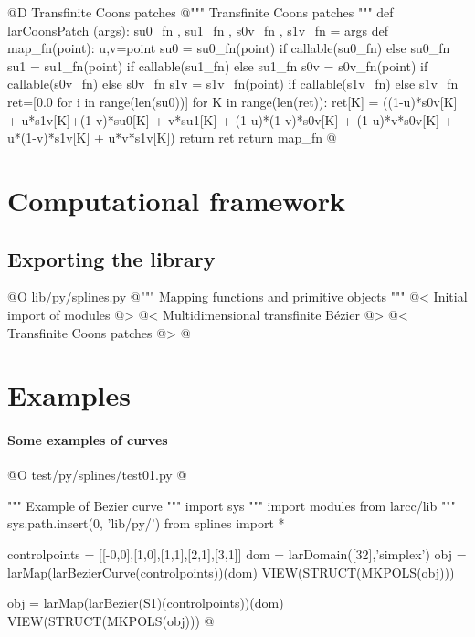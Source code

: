 \documentclass[11pt,oneside]{article}	%
\begin{document}
@D Transfinite Coons patches
@{""" Transfinite Coons patches """
def larCoonsPatch (args):
	su0_fn , su1_fn , s0v_fn , s1v_fn = args
	def map_fn(point):
		u,v=point
		su0 = su0_fn(point) if callable(su0_fn) else su0_fn
		su1 = su1_fn(point) if callable(su1_fn) else su1_fn
		s0v = s0v_fn(point) if callable(s0v_fn) else s0v_fn
		s1v = s1v_fn(point) if callable(s1v_fn) else s1v_fn
		ret=[0.0 for i in range(len(su0))]	
		for K in range(len(ret)):
			ret[K] = ((1-u)*s0v[K] + u*s1v[K]+(1-v)*su0[K] + v*su1[K] + 
			(1-u)*(1-v)*s0v[K] + (1-u)*v*s0v[K] + u*(1-v)*s1v[K] + u*v*s1v[K])
		return ret
	return map_fn
@}


\section{Computational framework}
\subsection{Exporting the library}
@O lib/py/splines.py
@{""" Mapping functions and primitive objects """
@< Initial import of modules @>
@< Multidimensional transfinite B\'ezier @>
@< Transfinite Coons patches @>
@}


\section{Examples}

\paragraph{Some examples of curves}

@O test/py/splines/test01.py 
@{""" Example of Bezier curve """
import sys
""" import modules from larcc/lib """
sys.path.insert(0, 'lib/py/')
from splines import *

controlpoints = [[-0,0],[1,0],[1,1],[2,1],[3,1]]
dom = larDomain([32],'simplex')
obj = larMap(larBezierCurve(controlpoints))(dom)
VIEW(STRUCT(MKPOLS(obj)))

obj = larMap(larBezier(S1)(controlpoints))(dom)
VIEW(STRUCT(MKPOLS(obj)))
@}
\end{document}
